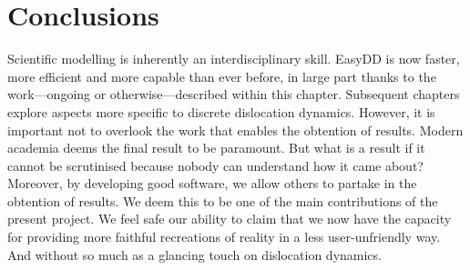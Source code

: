 \section{Conclusions}

Scientific modelling is inherently an interdisciplinary skill. EasyDD is now faster, more efficient and more capable than ever before, in large part thanks to the work---ongoing or otherwise---described within this chapter. Subsequent chapters explore aspects more specific to discrete dislocation dynamics. However, it is important not to overlook the work that enables the obtention of results. Modern academia deems the final result to be paramount. But what is a result if it cannot be scrutinised because nobody can understand how it came about? Moreover, by developing good software, we allow others to partake in the obtention of results. We deem this to be one of the main contributions of the present project. We feel safe our ability to claim that we now have the capacity for providing more faithful recreations of reality in a less user-unfriendly way. And without so much as a glancing touch on dislocation dynamics.
\savearabiccounter
